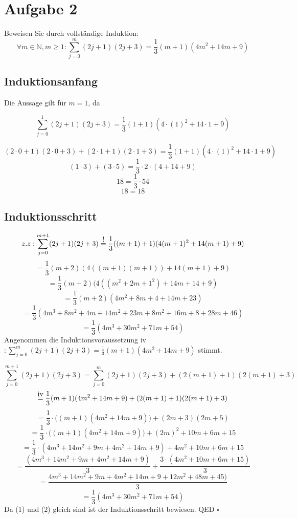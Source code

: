 \documentclass[a4paper]{article}
\newcommand\IVeq{\stackrel{\mathclap{\normalfont\mbox{iv}}}{=}}
\newcommand\EXeq{\stackrel{\mathclap{\normalfont\mbox{!}}}{=}}
\newcommand*{\QED}{\null\nobreak\hfill\ensuremath{\square}}%
\begin{document}
\newpage

\section{Aufgabe 2}

Beweisen Sie durch vollständige Induktion:
\[ \forall m \in \mathbb{N},m \geq 1 :  \sum_{j=0}^m (2j+1)(2j+3) = \frac{1}{3}(m+1)(4m^2 + 14m + 9)\]

\subsection{Induktionsanfang}
Die Aussage gilt für $m=1$, da


\[\sum_{j=0}^1 (2j+1)(2j+3)  = \frac{1}{3}(1+1)(4 \cdot (1)^2 + 14 \cdot 1 + 9)\]

\[ (2 \cdot 0 + 1)(2 \cdot 0 + 3) + (2 \cdot 1 + 1)(2 \cdot 1 + 3) =  \frac{1}{3}(1+1)(4 \cdot (1)^2 + 14 \cdot 1 + 9) \]
\[ (1 \cdot 3) + (3 \cdot 5) =  \frac{1}{3} \cdot 2 \cdot (4 + 14 + 9) \]
\[ 18 = \frac{1}{3} \cdot 54\]
\[ 18 = 18 \]

\subsection{Induktionsschritt}

\begin{equation}
 z.z:  \sum_{j=0}^{m+1} (2j+1)(2j+3) \EXeq \frac{1}{3}((m+1) + 1)(4(m+1)^2 + 14(m+1) + 9) 
\end{equation}
\[ = \frac{1}{3}(m+2)(4((m+1)(m+1)) + 14(m+1) + 9) \]
\[ = \frac{1}{3}(m+2)(4((m^2 + 2m + 1^2) + 14m + 14 + 9) \]
\[ = \frac{1}{3}(m+2)(4m^2 + 8m + 4 + 14m + 23) \]
\[ = \frac{1}{3}(4m^3 + 8m^2 + 4m + 14m^2 + 23m + 8m^2 + 16m + 8 + 28m + 46) \]
\[ = \frac{1}{3}(4m^3 + 30m^2 + 71m + 54) \]
\newline 
Angenommen die Induktionsvoraussetzung iv $ : \sum_{j=0}^m (2j+1)(2j+3) = \frac{1}{3}(m+1)(4m^2 + 14m + 9)$ stimmt.


\begin{equation}
\sum_{j=0}^{m+1} (2j+1)(2j+3) = \sum_{j=0}^m (2j+1)(2j+3) + (2(m+1)+1)(2(m+1)+3)
\end{equation}
\[ \IVeq  \frac{1}{3}(m+1)(4m^2 + 14m + 9) + (2(m+1)+1)(2(m+1)+3) \]
\[ = \frac{1}{3} \cdot \big((m+1)(4m^2 + 14m + 9)\big) + (2m+3)(2m+5)\]
\[ = \frac{1}{3} \cdot \big((m+1)(4m^2 + 14m + 9)\big) + (2m)^2 + 10m + 6m + 15\]
\[ = \frac{1}{3} \cdot (4m^3 + 14m^2 + 9m + 4m^2 + 14m + 9) + 4m^2 + 10m + 6m + 15\]
\[ = \frac{(4m^3 + 14m^2 + 9m + 4m^2 + 14m + 9)}{3}  + \frac{3 \cdot (4m^2 + 10m + 6m + 15)}{3}\]
\[ = \frac{4m^3 + 14m^2 + 9m + 4m^2 + 14m + 9 + 12m^2 + 48m + 45)}{3}\]
\[ = \frac{1}{3}(4m^3 + 30m^2 + 71m + 54)\]
\endline
Da (1) und (2) gleich sind ist der Induktionsschritt bewiesen. QED \QED
\end{document}
